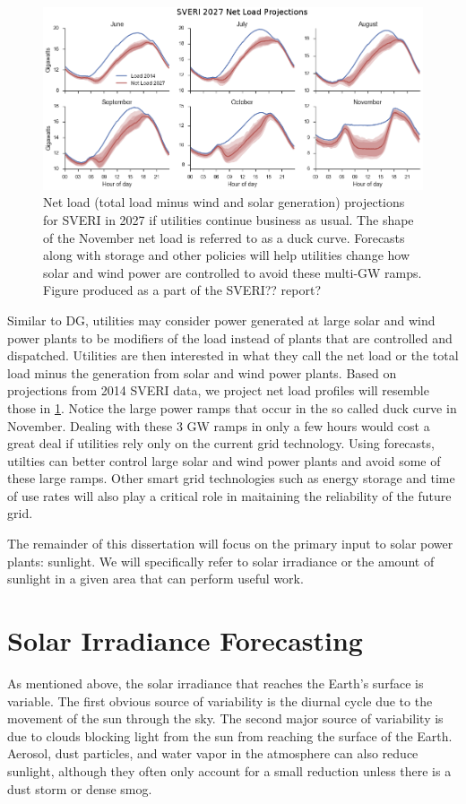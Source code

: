 \begin{figure}[h]
\centering
\includegraphics[width=\textwidth]{figs/duckcurves.png}
\caption[Projected SVERI 2027 duck curves]{Net load (total load minus
  wind and solar generation) projections for SVERI in 2027 if
  utilities continue business as usual. The shape of the November net
  load is referred to as a duck curve. Forecasts along with storage
  and other policies will help utilities change how solar and wind
  power are controlled to avoid these multi-GW ramps. Figure produced
  as a part of the SVERI?? report?}
\label{fig:duckcurves}
\end{figure}

Similar to DG, utilities may consider power generated at large solar
and wind power plants to be modifiers of the load instead of plants
that are controlled and dispatched.
Utilities are then interested in what they call the net load or the
total load minus the generation from solar and wind power plants.
Based on projections from 2014 SVERI data, we project net load
profiles will resemble those in \cref{fig:duckcurves}.
Notice the large power ramps that occur in the so called duck curve in
November.
Dealing with these 3 GW ramps in only a few hours would cost a great
deal if utilities rely only on the current grid technology.
Using forecasts, utilties can better control large solar and wind
power plants and avoid some of these large ramps.
Other smart grid technologies such as energy storage and time of use
rates will also play a critical role in maitaining the reliability of
the future grid.

The remainder of this dissertation will focus on the primary input to
solar power plants: sunlight.
We will specifically refer to solar irradiance or the amount of
sunlight in a given area that can perform useful work.

\section{Solar Irradiance Forecasting}
As mentioned above, the solar irradiance that reaches the Earth's
surface is variable.
The first obvious source of variability is the diurnal cycle due to
the movement of the sun through the sky.
The second major source of variability is due to clouds blocking light
from the sun from reaching the surface of the Earth.
Aerosol, dust particles, and water vapor in the atmosphere can also
reduce sunlight, although they often only account for a small
reduction unless there is a dust storm or dense smog.

